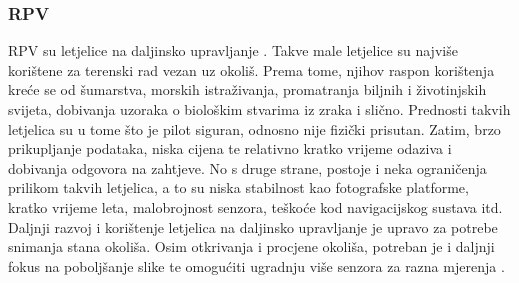 \documentclass[times, utf8, diplomski]{fer}
\begin{document}
\subsubsection{RPV}
RPV su letjelice na daljinsko upravljanje . Takve male letjelice  su  najviše  korištene  za  terenski  rad  vezan  uz  okoliš. Prema  tome,  njihov  raspon korištenja kreće se od šumarstva, morskih istraživanja, promatranja biljnih i životinjskih svijeta, dobivanja uzoraka o biološkim stvarima iz zraka i slično. Prednosti takvih letjelica su u tome što je pilot siguran, odnosno nije fizički prisutan. Zatim, brzo prikupljanje podataka, niska cijena te relativno kratko vrijeme odaziva i dobivanja odgovora na zahtjeve. No s druge strane, postoje i neka ograničenja prilikom takvih letjelica, a to su niska stabilnost kao fotografske platforme, kratko vrijeme leta, malobrojnost senzora, teškoće kod navigacijskog sustava itd. \\
Daljnji razvoj i korištenje letjelica na daljinsko upravljanje je upravo za potrebe snimanja stana okoliša. Osim otkrivanja i procjene okoliša, potreban je i daljnji fokus na poboljšanje slike te omogućiti ugradnju više senzora za razna mjerenja \citep{Hardin}.
\end{document}
